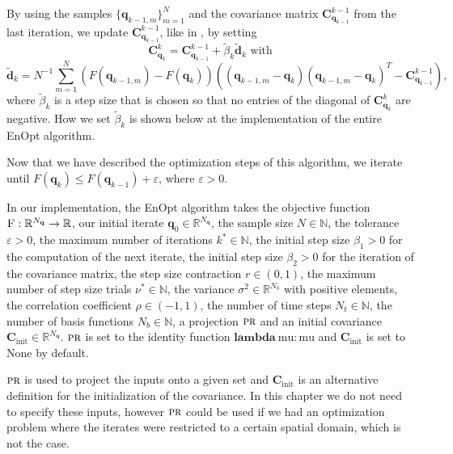 By using the samples $\{\mathbf{q}_{k-1,m}\}_{m=1}^N$ and the covariance matrix $\mathbf{C}_{\mathbf{q}_{k-1}}^{k-1}$ from the last iteration, we update $\mathbf{C}_{\mathbf{q}_{k-1}}^{k-1}$, like in \cite{Stordal2016-cj}, by setting
\begin{equation}
\label{updateCov}
\mathbf{C}_{\mathbf{q}_{k}}^{k}=\mathbf{C}_{\mathbf{q}_{k-1}}^{k-1}+\tilde{\beta}_k\tilde{\mathbf{d}}_k\text{ with}
\end{equation}
\begin{equation}
\label{updateCovDirection}
\tilde{\mathbf{d}}_k=N^{-1}\sum_{m=1}^N(F(\mathbf{q}_{k-1,m})-F(\mathbf{q}_k))((\mathbf{q}_{k-1,m}-\mathbf{q}_k)(\mathbf{q}_{k-1,m}-\mathbf{q}_k)^T-\mathbf{C}_{\mathbf{q}_{k-1}}^{k-1}),
\end{equation}
where $\tilde{\beta}_k$ is a step size that is chosen so that no entries of the diagonal of $\mathbf{C}_{\mathbf{q}_{k}}^{k}$ are negative. How we set $\tilde{\beta}_k$ is shown below at the implementation of the entire EnOpt algorithm.

Now that we have described the optimization steps of this algorithm, we iterate until $F(\mathbf{q}_k)\leq F(\mathbf{q}_{k-1})+\varepsilon$, where $\varepsilon>0$.

In our implementation, the EnOpt algorithm takes the objective function $\textproc{F}:\mathbb{R}^{N_\mathbf{q}}\to\mathbb{R}$, our initial iterate $\mathbf{q}_0\in\mathbb{R}^{N_\mathbf{q}}$, the sample size $N\in\mathbb{N}$, the tolerance $\varepsilon>0$, the maximum number of iterations $k^*\in\mathbb{N}$, the initial step size $\beta_1>0$ for the computation of the next iterate, the initial step size $\beta_2>0$ for the iteration of the covariance matrix, the step size contraction $r\in(0,1)$, the maximum number of step size trials $\nu^*\in\mathbb{N}$, the variance $\sigma^2\in\mathbb{R}^{N_b}$ with positive elements, the correlation coefficient $\rho\in(-1,1)$, the number of time steps $N_t\in\mathbb{N}$, the number of basis functions $N_b\in\mathbb{N}$, a projection $\textproc{pr}$ and an initial covariance $\mathbf{C}_\mathrm{init}\in\mathbb{R}^{N_\mathbf{q}}$. $\textproc{pr}$ is set to the identity function $\mathbf{lambda}\:\mathrm{mu}: \mathrm{mu}$ and $\mathbf{C}_\mathrm{init}$ is set to $\mathrm{None}$ by default.

$\textproc{pr}$ is used to project the inputs onto a given set and $\mathbf{C}_\mathrm{init}$ is an alternative definition for the initialization of the covariance. In this chapter we do not need to specify these inputs, however $\textproc{pr}$ could be used if we had an optimization problem where the iterates were restricted to a certain spatial domain, which is not the case.

